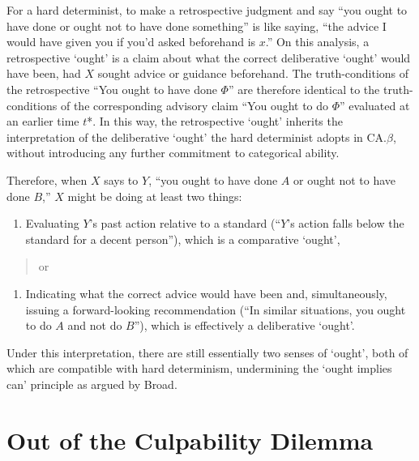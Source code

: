 \noindent For a hard determinist, to make a retrospective judgment and say ``you
ought to have done or ought not to have done something'' is like saying,
``the advice I would have given you if you'd asked beforehand is $x$.'' On
this analysis, a retrospective `ought' is a claim about what the correct
deliberative `ought' would have been, had $X$ sought advice or guidance
beforehand. The truth-conditions of the retrospective ``You ought to
have done $\Phi$'' are therefore identical to the truth-conditions of the
corresponding advisory claim ``You ought to do $\Phi$'' evaluated at an
earlier time $t$*. In this way, the retrospective `ought' inherits the
interpretation of the deliberative `ought' the hard determinist adopts
in CA.$\beta$, without introducing any further commitment to categorical
ability.

Therefore, when $X$ says to $Y$, ``you ought to have done $A$ or ought not to
have done $B$,'' $X$ might be doing at least two things:

\vspace{-1em}
\begin{enumerate}
\def\labelenumi{(\arabic{enumi})}
\item
  Evaluating $Y$'s past action relative to a standard (``$Y$'s action falls
  below the standard for a decent person''), which is a comparative
  `ought',
\end{enumerate}

\vspace{-2em}
\begin{quote}
or
\end{quote}
\vspace{-1em}

\vspace{-1em}
\begin{enumerate}
\def\labelenumi{(\arabic{enumi})}
\setcounter{enumi}{1}
\item
  Indicating what the correct advice would have been and,
  simultaneously, issuing a forward-looking recommendation (``In similar
  situations, you ought to do $A$ and not do $B$''), which is effectively a
  deliberative `ought'.
\end{enumerate}

\noindent Under this interpretation, there are still essentially two senses of
`ought', both of which are compatible with hard determinism, undermining
the `ought implies can' principle as argued by Broad.

\section{Out of the Culpability Dilemma}

